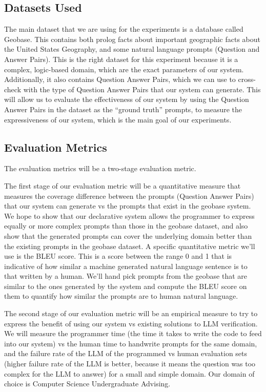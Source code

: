 \documentclass{article}
\begin{document}
\subsection{Datasets Used}
The main dataset that we are using for the experiments is a database called Geobase. This contains both prolog facts about important geographic facts about the United States Geography, and some natural language prompts (Question and Answer Pairs). This is the right dataset for this experiment because it is a complex, logic-based domain, which are the exact parameters of our system. Additionally, it also contains Question Answer Pairs, which we can use to cross-check with the type of Question Answer Pairs that our system can generate. This will allow us to evaluate the effectiveness of our system by using the Question Answer Pairs in the dataset as the “ground truth” prompts, to measure the expressiveness of our system, which is the main goal of our experiments.

\subsection{Evaluation Metrics}


The evaluation metrics will be a two-stage evaluation metric. 


The first stage of our evaluation metric will be a quantitative measure that measures the coverage difference between the prompts (Question Answer Pairs) that our system can generate vs the prompts that exist in the geobase system.  We hope to show that our declarative system allows the programmer to express equally or more complex prompts than those in the geobase dataset, and also show that the generated prompts can cover the underlying domain better than the existing prompts in the geobase dataset. A specific quantitative metric we’ll use is the BLEU score.  This is a score between the range 0 and 1 that is indicative of how similar a machine generated natural language sentence is to that written by a human.  We’ll hand pick prompts from the geobase that are similar to the ones generated by the system and compute the BLEU score on them to quantify how similar the prompts are to human natural language.


The second stage of our evaluation metric will be an empirical measure to try to express the benefit of using our system vs existing solutions to LLM verification. We will measure the programmer time (the time it takes to write the code to feed into our system) vs the human time to handwrite prompts for the same domain, and the failure rate of the LLM of the programmed vs human evaluation sets (higher failure rate of the LLM is better, because it means the question was too complex for the LLM to answer) for a small and simple domain. Our domain of choice is Computer Science Undergraduate Advising.
\end{document}
